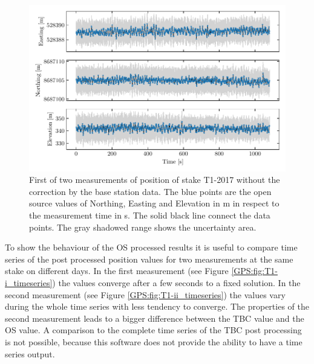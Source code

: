 \begin{figure}[h]
    \centering
    \includegraphics[width=.9\textwidth]{./figs/timeseries/46250700_org-T1-i-2017_Timeseries-east-north-elev.pdf}
    \caption{First of two measurements of position of stake T1-2017 without the correction by the base station data. The blue points are the open source values of Northing, Easting and Elevation in m in respect to the measurement time in s. The solid black line connect the data points. The gray shadowed range shows the uncertainty area.}
    \label{GPS:fig:T1-i_nocorr}
\end{figure}

To show the behaviour of the OS processed results it is useful to compare time series of the post processed position values for two measurements at the same stake on different days.
In the first measurement (see Figure \ref{GPS:fig:T1-i_timeseries}) the values converge after a few seconds to a fixed solution.
In the second measurement (see Figure \ref{GPS:fig:T1-ii_timeseries}) the values vary during the whole time series with less tendency to converge.
The properties of the second measurement leads to a bigger difference between the TBC value and the OS value.
A comparison to the complete time series of the TBC post processing is not possible, because this software does not provide the ability to have a time series output.

